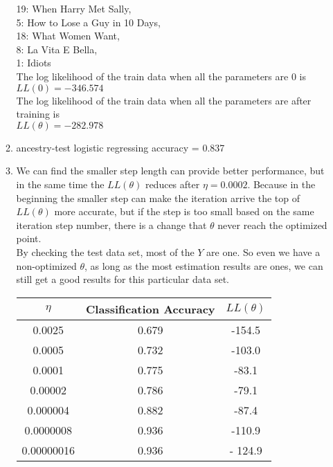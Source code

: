 \documentclass{article}
\begin{document}
\begin{enumerate}
\begin{enumerate}
		19:  When Harry Met Sally,\\
		5: How to Lose a Guy in 10 Days, \\
		18: What Women Want, \\
		8: La Vita E Bella, \\
		1: Idiots\\
		The log likelihood of the train data when all the parameters are 0 is\\
		$LL(0) = -346.574$\\
		The log likelihood of the train data when all the parameters are after training is\\
		$LL(\theta) = -282.978$\\
		\item 
		ancestry-test logistic regressing accuracy = 0.837\\
		\item
		We can find the smaller step length can provide better performance, but in the same time the $LL(\theta)$ reduces after $\eta = 0.0002$. Because in the beginning the smaller step can make the iteration arrive the top of $LL(\theta)$ more accurate, but if the step is too small based on the same iteration step number, there is a change that $\theta$ never reach the optimized point.\\
		By checking the test data set, most of the $Y$ are one. So even we have a non-optimized $\theta$, as long as the most estimation results are ones, we can still get a good results for this particular data set.\\
		\begin{tabular}{|c|c|c|}
			\hline
			$\eta$ & Classification Accuracy& $LL(\theta)$\\
			\hline
			0.0025 & 0.679 & -154.5\\
			0.0005 & 0.732 & -103.0\\
			0.0001 & 0.775 & -83.1\\
			0.00002 & 0.786 & -79.1\\
			0.000004 & 0.882 & -87.4\\
			0.0000008 & 0.936 & -110.9\\
			0.00000016 & 0.936 & - 124.9\\

			\hline
		\end{tabular}\\
	
		 
	\end{enumerate}
	
	
	
\end{enumerate}


\newpage
\end{document}
